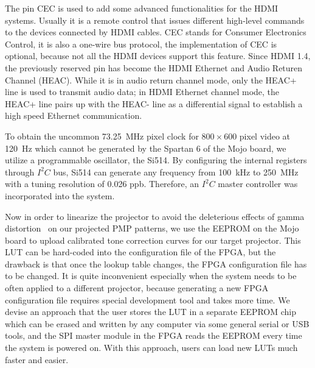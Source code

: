 \documentclass[]{spie}  %
\begin{document}
The pin CEC is used to add some advanced functionalities for the HDMI systems. Usually it is a remote control that issues different high-level commands to the devices connected by HDMI cables. CEC stands for Consumer Electronics Control, it is also a one-wire bus protocol, the implementation of CEC is optional, because not all the HDMI devices support this feature. Since HDMI 1.4, the previously reserved pin has become the HDMI Ethernet and Audio Returen Channel (HEAC). While it is in audio return channel mode, only the HEAC+ line is used to transmit audio data; in HDMI Ethernet channel mode, the HEAC+ line pairs up with the HEAC- line as a differential signal to establish a high speed Ethernet communication.

To obtain the uncommon 73.25~MHz pixel clock for $800\times 600$ pixel video at 120~Hz which cannot be generated by the Spartan 6 of the Mojo board, we utilize a programmable oscillator, the Si514. By configuring the internal registers through $I^2C$ bus, Si514 can generate any frequency from 100~kHz to 250~MHz with a tuning resolution of 0.026 ppb. Therefore, an $I^2C$ master controller was incorporated into the system.%

Now in order to linearize the projector to avoid the deleterious effects of gamma distortion~\cite{gamm10} on our projected PMP patterns, we use the EEPROM on the Mojo board to upload calibrated tone correction curves for our target projector.
This LUT can be hard-coded into the configuration file of the FPGA, but the drawback is that once the lookup table changes, the FPGA configuration file has to be changed. It is quite inconvenient especially when the system needs to be often applied to a different projector, because generating a new FPGA configuration file requires special development tool and takes more time. We devise an approach that the user stores the LUT in a separate EEPROM chip which can be erased and written by any computer via some general serial or USB tools, and the SPI master module in the FPGA reads the EEPROM every time the system  is powered on. With this approach, users can load new LUTs much faster and easier.
\end{document}

